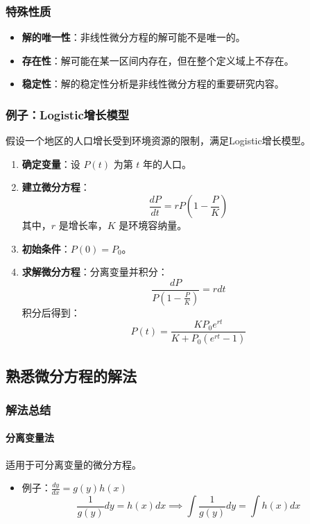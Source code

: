 \documentclass[UTF8]{ctexart}
\begin{document}
\subsubsection {特殊性质}
\begin{itemize}
    \item \textbf{解的唯一性}：非线性微分方程的解可能不是唯一的。
    \item \textbf{存在性}：解可能在某一区间内存在，但在整个定义域上不存在。
    \item \textbf{稳定性}：解的稳定性分析是非线性微分方程的重要研究内容。
\end{itemize}

\subsubsection {例子：Logistic增长模型}
假设一个地区的人口增长受到环境资源的限制，满足Logistic增长模型。
\begin{enumerate}
    \item \textbf{确定变量}：设 \( P(t) \) 为第 \( t \) 年的人口。
    \item \textbf{建立微分方程}：
    \[
    \frac{dP}{dt} = rP \left(1 - \frac{P}{K}\right)
    \]
    其中，\( r \) 是增长率，\( K \) 是环境容纳量。
    \item \textbf{初始条件}：\( P(0) = P_0 \)。
    \item \textbf{求解微分方程}：分离变量并积分：
    \[
    \frac{dP}{P(1 - \frac{P}{K})} = r dt
    \]
    积分后得到：
    \[
    P(t) = \frac{K P_0 e^{rt}}{K + P_0 (e^{rt} - 1)}
    \]
\end{enumerate}

\subsection {熟悉微分方程的解法}
\subsubsection {解法总结}
\paragraph{分离变量法}
适用于可分离变量的微分方程。
\begin{itemize}
    \item 例子：\(\frac{dy}{dx} = g(y)h(x)\)
    \[
    \frac{1}{g(y)}dy = h(x)dx \implies \int \frac{1}{g(y)}dy = \int h(x)dx
    \]
\end{itemize}
\end{document}
